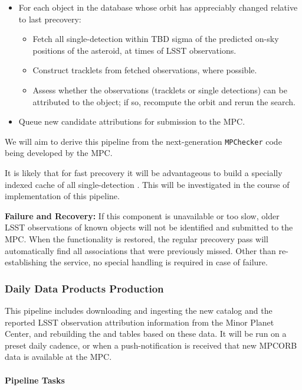 \begin{itemize}
	\item For each object in the \MPCORB database whose orbit has appreciably changed relative to last precovery:
	\begin{itemize}
		\item Fetch all single-detection \DIAObjects within TBD sigma of the predicted on-sky positions of the asteroid, at times of LSST observations.
		\item Construct tracklets from fetched observations, where possible.
		\item Assess whether the observations (tracklets or single detections) can be attributed to the object; if so, recompute the orbit and rerun the search.
	\end{itemize}
	\item Queue new candidate attributions for submission to the MPC.
\end{itemize}

We will aim to derive this pipeline from the next-generation {\tt MPChecker} code being developed by the MPC.

It is likely that for fast precovery it will be advantageous to build a specially indexed cache of all single-detection \DIAObjects. This will be investigated in the course of implementation of this pipeline.

{\bf Failure and Recovery:} If this component is unavailable or too slow, older LSST observations of known objects will not be identified and submitted to the MPC. When the functionality is restored, the regular precovery pass will automatically find all associations that were previously missed. Other than re-establishing the service, no special handling is required in case of failure.

\subsubsection{Daily Data Products Production}

This pipeline includes downloading and ingesting the new \MPCORB catalog and the reported LSST observation attribution information from the Minor Planet Center, and rebuilding the \SSObject and \SSSource tables based on these data. It will be run on a preset daily cadence, or when a push-notification is received that new MPCORB data is available at the MPC.

\paragraph{Pipeline Tasks}

